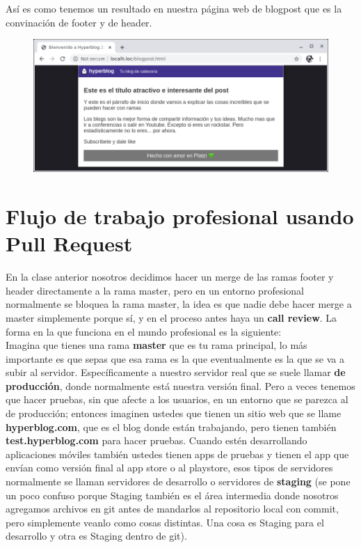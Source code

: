 \documentclass{article}
\begin{document}
Así es como tenemos un resultado en nuestra página web de blogpost que es la
convinación de footer y de header.

\newpage

\begin{figure}[h!]
  \centering
  \includegraphics[scale=0.75]{./Pictures/300_web_master.png}
\end{figure}


\newpage

\section{Flujo de trabajo profesional usando Pull Request}%
En la clase anterior nosotros decidimos hacer un merge de las ramas footer y
header directamente a la rama master, pero en un entorno profesional
normalmente se bloquea la rama master, la idea es que nadie debe hacer merge a
master simplemente porque sí, y en el proceso antes haya un \textbf{call
review}. La forma en la que funciona en el mundo profesional es la siguiente:\\

Imagina que tienes una rama \textbf{master} que es tu rama principal, lo más
importante es que sepas que esa rama es la que eventualmente es la que se va a
subir al servidor. Específicamente a nuestro servidor real que se suele llamar
\textbf{de producción}, donde normalmente está nuestra versión final. Pero a
veces tenemos que hacer pruebas, sin que afecte a los usuarios, en un entorno
que se parezca al de producción; entonces imaginen ustedes que tienen un sitio
web que se llame \textbf{hyperblog.com}, que es el blog donde están trabajando,
pero tienen también \textbf{test.hyperblog.com} para hacer pruebas. Cuando
estén desarrollando aplicaciones móviles también ustedes tienen apps de pruebas
y tienen el app que envían como versión final al app store o al playstore, esos
tipos de servidores normalmente se llaman servidores de desarrollo o servidores
de \textbf{staging} (se pone un poco confuso porque Staging también es el área
intermedia donde nosotros agregamos archivos en git antes de mandarlos al
repositorio local con commit, pero simplemente veanlo como cosas distintas. Una
cosa es Staging para el desarrollo y otra es Staging dentro de git).\\
\end{document}
